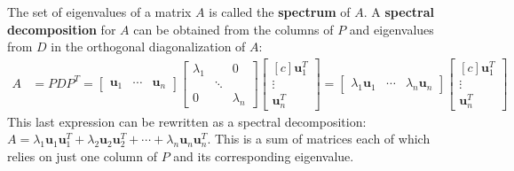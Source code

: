 \documentclass[10pt]{book}
\newcommand{\boxcolor}{gray!30}
\newenvironment{boxdef}{\begin{mdframed}[backgroundcolor=\boxcolor,linewidth=0pt,nobreak=true]}{\end{mdframed}}
\theoremstyle{definition}
\newcommand{\vect}[1]{\ensuremath{\boldsymbol{\mathbf{#1}}}}
\begin{document}
\begin{boxdef}
	The set of eigenvalues of a matrix $A$ is called the \textbf{spectrum} of $A$. A \textbf{spectral decomposition} for $A$ can be obtained from the columns of $P$ and eigenvalues from $D$ in the orthogonal diagonalization of $A$:
	\begin{align*}
	A &= PDP^T
	= \begin{bmatrix}\vect{u}_1&\cdots&\vect{u}_n\end{bmatrix}
	\begin{bmatrix}\lambda_1&&0\\&\ddots&\\0&&\lambda_n\end{bmatrix}
	\begin{bmatrix}[c]\vect{u}_1^T\\ \vdots\\ \vect{u}_n^T\end{bmatrix}
	= \begin{bmatrix}\lambda_1\vect{u}_1&\cdots&\lambda_n\vect{u}_n\end{bmatrix}
	\begin{bmatrix}[c]\vect{u}_1^T\\ \vdots\\ \vect{u}_n^T\end{bmatrix}
	\end{align*}
	This last expression can be rewritten as a spectral decomposition:
	$A = \lambda_1\vect{u}_1\vect{u}_1^T + \lambda_2\vect{u}_2\vect{u}_2^T + \cdots + \lambda_n\vect{u}_n\vect{u}_n^T.$ This is a sum of matrices each of which relies on just one column of $P$ and its corresponding eigenvalue.
\end{boxdef}
\end{document}

